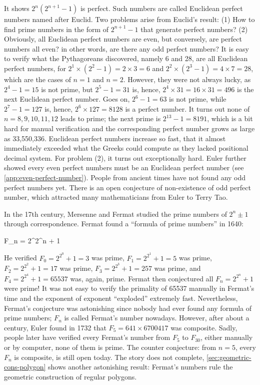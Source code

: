 \documentclass[b5paper]{article}
\begin{document}
 
It shows $2^n(2^{n+1}-1)$ is perfect. Such numbers are called Euclidean perfect numbers named after Euclid. Two problems arise from Euclid's result: (1) How to find prime numbers in the form of $2^{n+1} - 1$ that generate perfect numbers? (2) Obviously, all Euclidean perfect numbers are even, but conversely, are perfect numbers all even? in other words, are there any odd perfect numbers? It is easy to verify what the Pythagoreans discovered, namely 6 and 28, are all Euclidean perfect numbers, for $2^1\times(2^2-1)=2 \times 3 = 6$ and $2^2 \times (2^3 - 1) = 4 \times 7 = 28$, which are the cases of $n = 1$ and $n = 2$. However, they were not always lucky, as $2^4 - 1 = 15$ is not prime, but $2^5 - 1 = 31$ is, hence, $2^4 \times 31 = 16 \times 31 = 496$ is the next Euclidean perfect number. Goes on, $2^6 - 1 = 63$ is not prime, while $2^7 - 1 = 127$ is, hence, $2^6 \times 127 = 8128$ is a perfect number. It turns out none of $n = 8, 9, 10, 11, 12$ leads to prime; the next prime is $2^{13}-1 = 8191$, which is a bit hard for manual verification and the corresponding perfect number grows as large as 33,550,336. Euclidean perfect numbers increase so fast, that it almost immediately exceeded what the Greeks could compute as they lacked positional decimal system. For problem (2), it turns out exceptionally hard. Euler further showed every even perfect numbers must be an Euclidean perfect number (see \cref{app:even-perfect-number}). People from ancient times have not found any odd perfect numbers yet. There is an open conjecture of non-existence of odd perfect number, which attracted many mathematicians from Euler to Terry Tao.

In the 17th century, Mersenne and Fermat studied the prime numbers of $2^n \pm 1$ through correspondence. Fermat found a \enquote{formula of prime numbers} in 1640:

\be
F_n = 2^{2^n} + 1
\ee

He verified $F_0 = 2^{2^0} + 1 = 3$ was prime, $F_1 = 2^{2^1} + 1 = 5$ was prime, $F_2 = 2^{2^2} + 1 = 17$ was prime, $F_3 = 2^{2^3} + 1 = 257$ was prime, and $F_4 = 2^{2^4} + 1 = 65537$ was, again, prime. Fermat then conjectured all $F_n = 2^{2^n} + 1$ were prime! It was not easy to verify the primality of 65537 manually in Fermat's time and the exponent of exponent \enquote{exploded} extremely fast. Nevertheless, Fermat's conjecture was astonishing since nobody had ever found any formula of prime numbers; $F_n$ is called Fermat's number nowadays. However, after about a century, Euler found in 1732 that $F_5= 641 \times 6700417$ was composite. Sadly, people later have verified every Fermat's number from $F_5$ to $F_{30}$, either manually or by computer, none of them is prime. The counter conjecture: from $n = 5$, every $F_n$ is composite, is still open today. The story does not complete, \cref{sec:geometric-cons-polygon} shows another astonishing result: Fermat's numbers rule the geometric construction of regular polygons.
\end{document}
